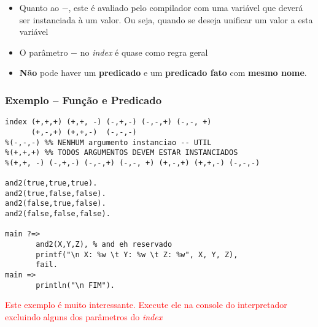 \begin{frame}[c,allowframebreaks=0.6,fragile]
\begin{itemize}
        \item Quanto ao $-$, este é avaliado pelo compilador com uma variável que deverá ser 
        instanciada à um valor. Ou seja, quando se deseja unificar um valor a esta variável
        
        \item O parâmetro $-$ no \textit{index} é quase como regra geral
        
        
        \item \textbf{Não} pode haver um \textbf{predicado} e um \textbf{predicado 
        fato} com \textbf{mesmo nome}.
        
    \end{itemize}
\end{frame}



\begin{frame} [fragile]
\frametitle{Exemplo -- Função e Predicado}

\begin{small}
\begin{verbatim}
index (+,+,+) (+,+, -) (-,+,-) (-,-,+) (-,-, +) 
      (+,-,+) (+,+,-)  (-,-,-)
%(-,-,-) %% NENHUM argumento instanciao -- UTIL
%(+,+,+) %% TODOS ARGUMENTOS DEVEM ESTAR INSTANCIADOS
%(+,+, -) (-,+,-) (-,-,+) (-,-, +) (+,-,+) (+,+,-) (-,-,-)

and2(true,true,true).
and2(true,false,false).
and2(false,true,false).
and2(false,false,false).

main ?=>
       and2(X,Y,Z), % and eh reservado
       printf("\n X: %w \t Y: %w \t Z: %w", X, Y, Z),
       fail.
main =>       
       println("\n FIM"). 
\end{verbatim}
\end{small}

\textcolor{red}{Este exemplo é muito interessante. Execute ele na console do interpretador
excluindo alguns dos parâmetros do \textit{index}}

\end{frame}



